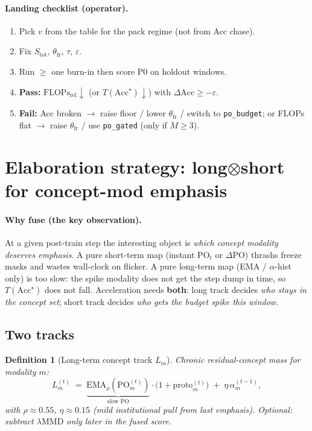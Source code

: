 \documentclass[11pt]{article}
\newtheorem{definition}{Definition}
\newcommand{\PO}{\mathrm{PO}}
\newcommand{\MMD}{\mathrm{MMD}}
\newcommand{\Acc}{\mathrm{Acc}}
\newcommand{\Flops}{\mathrm{FLOPs}_{\mathrm{rel}}}
\begin{document}
\paragraph{Landing checklist (operator).}
\begin{enumerate}[leftmargin=1.4em,itemsep=2pt]
  \item Pick $v$ from the table for the pack regime (not from Acc chase).
  \item Fix $S_{\mathrm{tot}}$, $\theta_{\mathrm{fr}}$, $\tau$, $\varepsilon$.
  \item Run $\ge$ one burn-in then score P0 on holdout windows.
  \item \textbf{Pass:} $\Flops\downarrow$ (or $T(\Acc^\star)\downarrow$)
        with $\Delta\Acc\ge-\varepsilon$.
  \item \textbf{Fail:} Acc broken $\to$ raise floor / lower
        $\theta_{\mathrm{fr}}$ / switch to \texttt{po\_budget};
        or FLOPs flat $\to$ raise $\theta_{\mathrm{fr}}$ / use
        \texttt{po\_gated} (only if $M\ge3$).
\end{enumerate}

\section{Elaboration strategy: long$\otimes$short for concept-mod emphasis}
\label{sec:fuse}

\paragraph{Why fuse (the key observation).}
At a given post-train step the interesting object is
\emph{which concept modality deserves emphasis}.
A pure short-term map (instant $\PO_t$ or $\Delta\PO$) thrashs
freeze masks and wastes wall-clock on flicker.
A pure long-term map (EMA / $\alpha$-hist only) is too slow: the
spike modality does not get the step dump in time, so
$T(\Acc^\star)$ does not fall.
Acceleration needs \textbf{both}:
long track decides \emph{who stays in the concept set};
short track decides \emph{who gets the budget spike this window}.

\subsection{Two tracks}
\label{sec:fuse-tracks}

\begin{definition}[Long-term concept track $L_m$]
Chronic residual-concept mass for modality $m$:
\[
  L_m^{(t)}
  \;=\;
  \underbrace{\mathrm{EMA}_{\rho}(\PO_m^{(t)})}_{\text{slow PO}}
  \cdot
  \bigl(1+\mathrm{proto}_m^{(t)}\bigr)
  \;+\;
  \eta\,\alpha_m^{(t-1)},
\]
with $\rho\!\approx\!0.55$, $\eta\!\approx\!0.15$ (mild institutional pull
from last emphasis).
Optional: subtract $\lambda\MMD$ only later in the fused score.
\end{definition}
\end{document}
